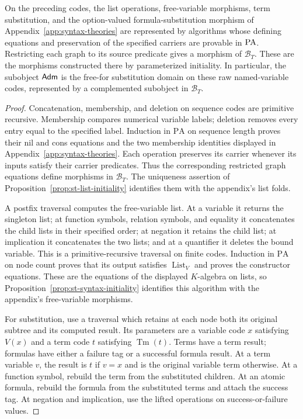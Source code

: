\begin{proposition}
\label{prop:st-substitution-realization}
On the preceding codes, the list operations, free-variable morphisms,
term substitution, and the option-valued formula-substitution morphism
of Appendix~\ref{app:syntax-theories} are represented by algorithms whose
defining equations and preservation of the specified carriers are
provable in $\mathrm{PA}$. Restricting each graph to its source predicate
gives a morphism of $\mathcal B_T$. These are the morphisms
constructed there by parameterized initiality. In particular, the
subobject $\mathsf{Adm}$ is the free-for substitution domain on
these raw named-variable codes, represented by a complemented
subobject in $\mathcal B_T$.
\end{proposition}
\begin{proof}
Concatenation, membership, and deletion on sequence codes are
primitive recursive. Membership compares numerical variable labels;
deletion removes every entry equal to the specified label.
Induction in $\mathrm{PA}$ on sequence length proves their nil and
cons equations and the two membership identities displayed in
Appendix~\ref{app:syntax-theories}. Each operation preserves its carrier whenever its
inputs satisfy their carrier predicates. Thus the corresponding
restricted graph equations define morphisms in $\mathcal B_T$.
The uniqueness assertion of
Proposition~\ref{prop:st-list-initiality} identifies them with the
appendix's list folds.

A postfix traversal computes the free-variable list. At a variable
it returns the singleton list; at function symbols, relation
symbols, and equality it concatenates the child lists in their
specified order; at negation it retains the child list; at
implication it concatenates the two lists; and at a quantifier it
deletes the bound variable. This is a primitive-recursive traversal
on finite codes. Induction in $\mathrm{PA}$ on node count proves
that its output satisfies $\operatorname{List}_V$ and proves the
constructor equations. These are the equations of the displayed
$K$-algebra on lists, so
Proposition~\ref{prop:st-syntax-initiality} identifies this algorithm
with the appendix's free-variable morphisms.

For substitution, use a traversal which retains at each node both
its original subtree and its computed result. Its parameters are
a variable code $x$ satisfying $V(x)$ and a term code $t$
satisfying $\operatorname{Tm}(t)$. Terms have a term result;
formulas have either a failure tag or a successful formula result.
At a term variable $v$, the result is $t$ if $v=x$ and is the
original variable term otherwise. At a function symbol, rebuild
the term from the substituted children. At an atomic formula,
rebuild the formula from the substituted terms and attach the
success tag. At negation and implication, use the lifted operations
on success-or-failure values.


\end{proof}
